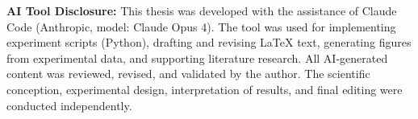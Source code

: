 \vspace{0.5cm}
\noindent\textbf{AI Tool Disclosure:} This thesis was developed with the assistance of Claude Code (Anthropic, model: Claude Opus 4). The tool was used for implementing experiment scripts (Python), drafting and revising LaTeX text, generating figures from experimental data, and supporting literature research. All AI-generated content was reviewed, revised, and validated by the author. The scientific conception, experimental design, interpretation of results, and final editing were conducted independently.

